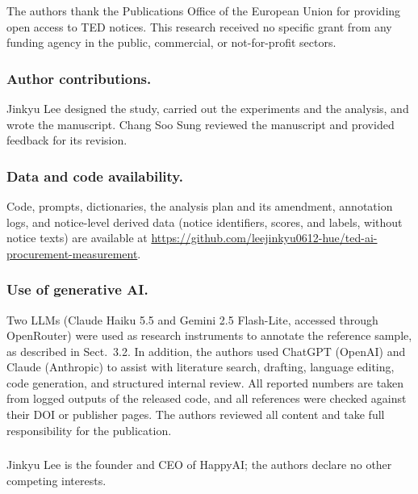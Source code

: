 \documentclass[runningheads]{llncs}
\begin{document}
\begin{credits}
\subsubsection{\ackname} The authors thank the Publications Office of the European Union for providing open access to TED notices. This research received no specific grant from any funding agency in the public, commercial, or not-for-profit sectors.

\subsubsection{Author contributions.} Jinkyu Lee designed the study, carried out the experiments and the analysis, and wrote the manuscript. Chang Soo Sung reviewed the manuscript and provided feedback for its revision.

\subsubsection{Data and code availability.} Code, prompts, dictionaries, the analysis plan and its amendment, annotation logs, and notice-level derived data (notice identifiers, scores, and labels, without notice texts) are available at \url{https://github.com/leejinkyu0612-hue/ted-ai-procurement-measurement}.

\subsubsection{Use of generative AI.} Two LLMs (Claude Haiku 5.5 and Gemini 2.5 Flash-Lite, accessed through OpenRouter) were used as research instruments to annotate the reference sample, as described in Sect.~3.2. In addition, the authors used ChatGPT (OpenAI) and Claude (Anthropic) to assist with literature search, drafting, language editing, code generation, and structured internal review. All reported numbers are taken from logged outputs of the released code, and all references were checked against their DOI or publisher pages. The authors reviewed all content and take full responsibility for the publication.

\subsubsection{\discintname} Jinkyu Lee is the founder and CEO of HappyAI; the authors declare no other competing interests.
\end{credits}



\end{document}
